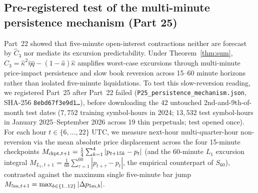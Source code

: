 \documentclass[12pt]{article}
\theoremstyle{definition}
\theoremstyle{remark}
\begin{document}
\subsection{Pre-registered test of the multi-minute persistence mechanism (Part 25)}\label{sec:p25}
Part~22 showed that five-minute open-interest contractions neither are forecast by $\hat C_3$ nor mediate its excursion predictability. Under Theorem~\ref{thm:sum}, $\hat C_3=\hat\kappa^2\hat\eta\hat q-(1-\hat a)\hat\kappa$ amplifies worst-case excursions through multi-minute price-impact persistence and slow book reversion across 15--60 minute horizons rather than isolated five-minute liquidations. To test this slow-reversion reading, we registered Part~25 after Part~22 failed (\texttt{P25\_persistence\_mechanism.json}, SHA-256 \texttt{8ebd67f3e9d1\ldots}), before downloading the 42 untouched 2nd-and-9th-of-month test dates ($7{,}752$ training symbol-hours in 2024; $13{,}532$ test symbol-hours in January 2025--September 2026 across 19 thin perpetuals; test opened once). For each hour $t\in\{6,\dots,22\}$ UTC, we measure next-hour multi-quarter-hour non-reversion via the mean absolute price displacement across the four 15-minute checkpoints $M_{{\rm ckpt},t+1}=\frac{1}{4}\sum_{k=1}^4|p_{t+15k}-p_t|$ (and the 60-minute $L_1$ excursion integral $M_{L_1,t+1}=\frac{1}{60}\sum_{\tau=1}^{60}|p_{t+\tau}-p_t|$, the empirical counterpart of $S_{60}$), contrasted against the maximum single five-minute bar jump $M_{5{\rm m},t+1}=\max_{b\in\{1..12\}}|\Delta p_{5{\rm m},b}|$.
\end{document}
